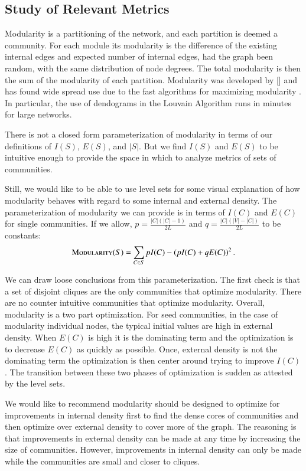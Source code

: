\documentclass[phd,tocprelim]{cornell}
\begin{document}
\subsection{Study of Relevant Metrics}


Modularity is a partitioning of the network, and each partition is deemed a community.  For each module its modularity is the difference of the existing internal edges and expected number of internal edges, had the graph been random, with the same distribution of node degrees.  The total modularity is then the sum of the modularity of each partition.  Modularity was developed by [] and has found wide spread use due to the fast algorithms for maximizing modularity \cite{modularity}.  In particular, the use of dendograms in the Louvain Algorithm \cite{louvain} runs in minutes for large networks.

There is not a closed form parameterization of modularity in terms of our definitions of $I(S)$, $E(S)$, and $|S|$.  But we find $I(S)$ and $E(S)$ to be intuitive enough to provide the space in which to analyze metrics of sets of communities.

Still, we would like to be able to use level sets for some visual explanation of how modularity behaves with regard to some internal and external density.  The parameterization of modularity we can provide is in terms of $I(C)$ and $E(C)$ for single communities.  If we allow, $p=\frac{|C|(|C|-1)}{2L}$ and $q=\frac{|C|(|V|-|C|)}{2L}$ to be constants:
\begin{equation}
 \mbox{\sc Modularity}(S) = \sum_{C \in S} p I(C) - \left(p I(C) + q E(C)\right)^2.
\end{equation}

We can draw loose conclusions from this parameterization.  The first check is that a set of disjoint cliques are the only communities that optimize modularity.  There are no counter intuitive communities that optimize modularity.  Overall, modularity is a two part optimization.  For seed communities, in the case of modularity individual nodes, the typical initial values are high in external density.  When $E(C)$ is high it is the dominating term and the optimization is to decrease $E(C)$ as quickly as possible.  Once, external density is not the dominating term the optimization is then center around trying to improve $I(C)$.  The transition between these two phases of optimization is sudden as attested by the level sets.

We would like to recommend modularity should be designed to optimize for improvements in internal density first to find the dense cores of communities and then optimize over external density to cover more of the graph.  The reasoning is that improvements in external density can be made at any time by increasing the size of communities.  However, improvements in internal density can only be made while the communities are small and closer to cliques.
\end{document}
